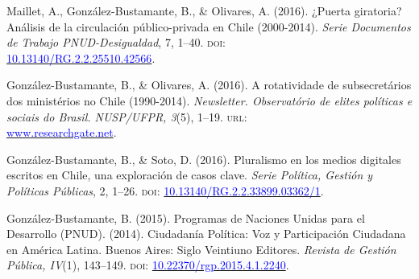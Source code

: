 
\begin{publications}

\begin{benumerate}{4}

\item{\small Maillet, A., González-Bustamante, B., \& Olivares, A. (2016). ¿Puerta giratoria? Análisis de la circulación público-privada en Chile (2000-2014). {\itshape Serie Documentos de Trabajo PNUD-Desigualdad}, 7, 1--40. {\scshape doi:} \\ \href{http://doi.org/10.13140/RG.2.2.25510.42566}{\textcolor{blue}{10.13140/RG.2.2.25510.42566}}.}\vspace{1mm}

\item{\small González-Bustamante, B., \& Olivares, A. (2016). A rotatividade de subsecretários dos ministérios no Chile (1990-2014). {\itshape Newsletter. Observat\'orio de elites pol\'iticas e sociais do Brasil. NUSP/UFPR, 3}(5), 1--19. {\scshape url:} \\ \href{https://www.researchgate.net/publication/321993740_A_rotatividade_de_subsecretarios_dos_ministerios_no_Chile_1990-2014}{\textcolor{blue}{www.researchgate.net}}.}\vspace{1mm}

\item{\small González-Bustamante, B., \& Soto, D. (2016). Pluralismo en los medios digitales escritos en Chile, una exploración de casos clave. {\itshape Serie Política, Gestión y Políticas Públicas}, 2, 1--26. {\scshape doi:} \href{http://doi.org/10.13140/RG.2.2.33899.03362/1}{\textcolor{blue}{10.13140/RG.2.2.33899.03362/1}}.}\vspace{1mm}

\item{\small González-Bustamante, B. (2015). Programas de Naciones Unidas para el Desarrollo (PNUD). (2014). Ciudadanía Política: Voz y Participación Ciudadana en América Latina. Buenos Aires: Siglo Veintiuno Editores. {\itshape Revista de Gestión Pública, IV}(1), 143--149. {\scshape doi:} \href{https://doi.org/10.22370/rgp.2015.4.1.2240}{\textcolor{blue}{10.22370/rgp.2015.4.1.2240}}.}

\end{benumerate}

\end{publications}
